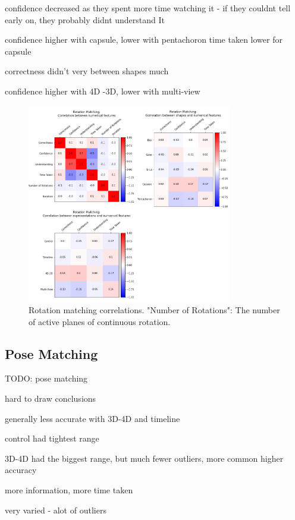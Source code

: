 \documentclass{l4proj}
\begin{document}
confidence decreased as they spent more time watching it - if they couldnt tell early on, they probably didnt understand It

confidence higher with capsule, lower with pentachoron
time taken lower for capsule

correctness didn't very between shapes much

confidence higher with 4D -3D, lower with multi-view

\begin{figure}
  \centering
  \includegraphics[width=0.8\textwidth]{images/results/rotation_matching_correlations.png}
  \caption{Rotation matching correlations. "Number of Rotations": The number of active planes of continuous rotation.}
  \label{fig:rot_corr}
\end{figure}

\subsection*{Pose Matching}

TODO: pose matching

hard to draw conclusions

generally less accurate with 3D-4D and timeline

control had tightest range

3D-4D had the biggest range, but much fewer outliers, more common higher accuracy

more information, more time taken

very varied - alot of outliers
\end{document}
